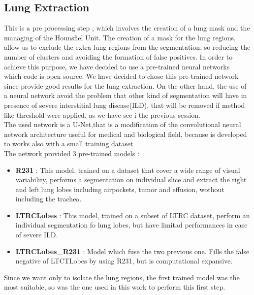 \documentclass{standalone}
\begin{document}
	\subsection{Lung Extraction}
	This is a pre processing step , which involves the creation of a lung mask and the managing of the Hounsfiel Unit. The creation of a mask for the lung regions, allow us to exclude the extra-lung regions from the segmentation, so reducing the number of clusters and avoiding the formation of false positives. In order to achieve this purpose, we have decided to use a pre-trained neural networks~\cite{REP:lungmask} which code is open source. We have decided to chose this pre-trained network since provide good results for the lung extraction. On the other hand, the use of a neural network avoid the problem that other kind of segmentation will have in presence of severe interstitial lung disease(ILD), that will be removed if method like threshold were applied, as we have see i the previous session.\\
	The used network is a U-Net,that is a modification of the convolutional neural network architecture useful for medical and biological field, because is developed to works also with a small training dataset\\
	The network provided 3 pre-trained models : 
	\begin{itemize}
		\item \textbf{R231} : This model, trained on a dataset that cover a wide range of visual variability, performs a segmentation on individual slice and extract the right and left lung lobes including airpockets, tumor and effusion, wothout including the trachea.
		
		\item \textbf{LTRCLobes} : This model, trained on a subset of LTRC dataset, perform an individual segmentation fo lung lobes, but have limitad performances in case of severe ILD.
		
		\item \textbf{LTRCLobes\_R231} : Model which fuse the two previous one. Fills the false negative of LTCTLobes by using R231, but is computational expansive.
	\end{itemize}

	Since we want only to isolate the lung regions, the first trained model was the most suitable, so was the one used in this work to perform this first step.\\
	
\end{document}
